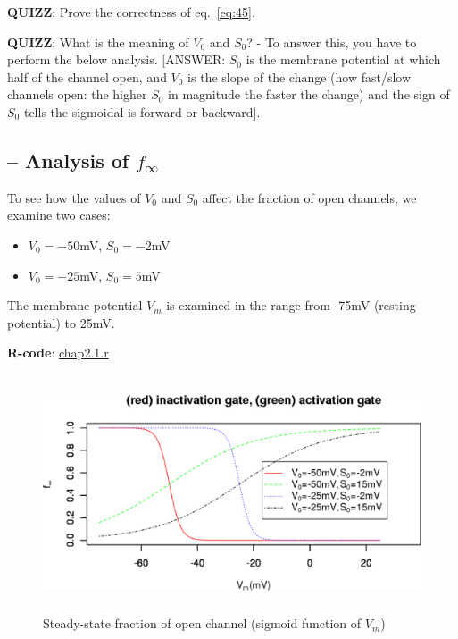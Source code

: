 {\bf QUIZZ}: Prove the correctness of eq.~\eqref{eq:45}.

{\bf QUIZZ}: What is the meaning of $V_0$ and $S_0$? - To answer this,
you have to perform the below analysis. [ANSWER: $S_0$ is the membrane
potential at which half of the channel open, and $V_0$ is the slope of the
change (how fast/slow channels open: the higher $S_0$ in magnitude the faster
the change) and the sign of $S_0$ tells the sigmoidal is forward or backward].

\subsection{-- Analysis of $f_\infty$}
\label{sec:analysis-2}

To see how the values of $V_0$ and $S_0$ affect the fraction of open
channels, we examine two cases:
\begin{itemize}
\item  $V_0 = -50$mV, $S_0 = -2$mV
\item  $V_0 = -25$mV, $S_0 = 5$mV
\end{itemize}
The membrane potential $V_m$ is examined in the range from -75mV
(resting potential) to 25mV.

{\bf R-code}: \hyperref[chap2.1.r]{chap2.1.r}



\begin{figure}[htb]
  \centerline{\includegraphics[height=7cm]{./images/equilibrium_open_fraction.eps}}
  \caption{Steady-state fraction of open channel (sigmoid function of
    $V_m$)}\label{fig:open_fraction}
\end{figure}

